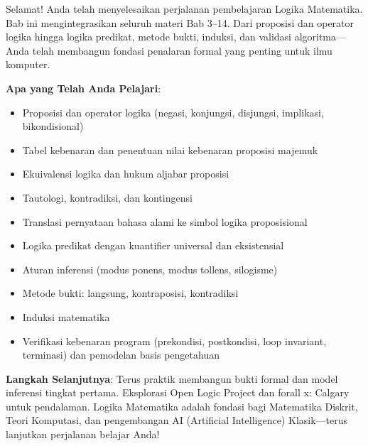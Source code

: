 \documentclass[../main]{subfiles}
\begin{document}
\begin{rangkuman}
Selamat! Anda telah menyelesaikan perjalanan pembelajaran Logika Matematika. Bab ini mengintegrasikan seluruh materi Bab 3--14. Dari proposisi dan operator logika hingga logika predikat, metode bukti, induksi, dan validasi algoritma---Anda telah membangun fondasi penalaran formal yang penting untuk ilmu komputer.

\textbf{Apa yang Telah Anda Pelajari}:
\begin{itemize}
  \item Proposisi dan operator logika (negasi, konjungsi, disjungsi, implikasi, bikondisional)
  \item Tabel kebenaran dan penentuan nilai kebenaran proposisi majemuk
  \item Ekuivalensi logika dan hukum aljabar proposisi
  \item Tautologi, kontradiksi, dan kontingensi
  \item Translasi pernyataan bahasa alami ke simbol logika proposisional
  \item Logika predikat dengan kuantifier universal dan eksistensial
  \item Aturan inferensi (modus ponens, modus tollens, silogisme)
  \item Metode bukti: langsung, kontraposisi, kontradiksi
  \item Induksi matematika
  \item Verifikasi kebenaran program (prekondisi, postkondisi, loop invariant, terminasi) dan pemodelan basis pengetahuan
\end{itemize}

\textbf{Langkah Selanjutnya}:
Terus praktik membangun bukti formal dan model inferensi tingkat pertama. Eksplorasi Open Logic Project dan forall x: Calgary untuk pendalaman. Logika Matematika adalah fondasi bagi Matematika Diskrit, Teori Komputasi, dan pengembangan AI (Artificial Intelligence) Klasik---terus lanjutkan perjalanan belajar Anda!
\end{rangkuman}

\ifSubfilesClassLoaded{
  \renewcommand{\bibname}{Daftar Pustaka}
  
  
}{}
\end{document}
